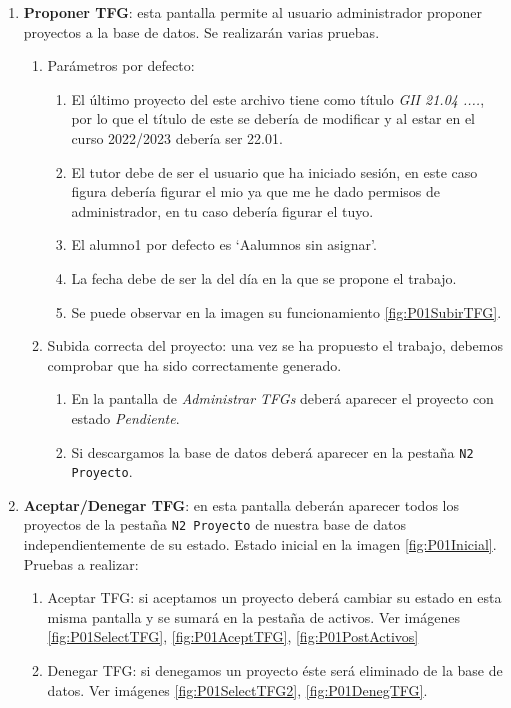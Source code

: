 \begin{enumerate}
	
	\item \textbf{Proponer TFG}: esta pantalla permite al usuario administrador proponer proyectos a la base de datos. Se realizarán varias pruebas.
			\begin{enumerate}
				\item Parámetros por defecto: 
					\begin{enumerate}
				 		\item El último proyecto del este archivo tiene como título \emph{GII 21.04 ....}, por lo que el título de este se debería de modificar y al estar en el curso 2022/2023 debería ser 22.01.
				 		\item El tutor debe de ser el usuario que ha iniciado sesión, en este caso figura debería figurar el mio ya que me he dado permisos de administrador, en tu caso debería figurar el tuyo.
				 		\item El alumno1 por defecto es `Aalumnos sin asignar'.
				 		\item La fecha debe de ser la del día en la que se propone el trabajo.
				 		\item Se puede observar en la imagen su funcionamiento \ref{fig:P01SubirTFG}.
					\end{enumerate}
				\item Subida correcta del proyecto: una vez se ha propuesto el trabajo, debemos comprobar que ha sido correctamente generado.
					\begin{enumerate}
						\item En la pantalla de \emph{Administrar TFGs} deberá aparecer el proyecto con estado \emph{Pendiente}.
						\item Si descargamos la base de datos deberá aparecer en la pestaña \texttt{N2 Proyecto}.						
					\end{enumerate}				
			\end{enumerate}

	
	\item \textbf{Aceptar/Denegar TFG}: en esta pantalla deberán aparecer todos los proyectos de la pestaña \texttt{N2 Proyecto} de nuestra base de datos independientemente de su estado. Estado inicial en la imagen \ref{fig:P01Inicial}. Pruebas a realizar:
		\begin{enumerate}
			\item Aceptar TFG: si aceptamos un proyecto deberá cambiar su estado en esta misma pantalla y se sumará en la pestaña de activos. Ver imágenes \ref{fig:P01SelectTFG},  \ref{fig:P01AceptTFG}, \ref{fig:P01PostActivos}
			\item Denegar TFG: si denegamos un proyecto éste será eliminado de la base de datos. Ver imágenes \ref{fig:P01SelectTFG2},
			\ref{fig:P01DenegTFG}.
		\end{enumerate}


\end{enumerate}
